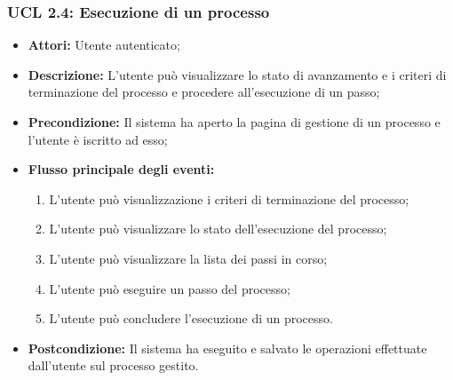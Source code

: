 \subsubsection{UCL 2.4: Esecuzione di un processo}
\begin{itemize}
\item \textbf{Attori:} Utente autenticato;
\item \textbf{Descrizione:} L'utente può visualizzare lo stato di avanzamento e i criteri di terminazione del processo e procedere all'esecuzione di un passo;
\item \textbf{Precondizione:} Il sistema ha aperto la pagina di gestione di un processo e l'utente è iscritto ad esso;
\item \textbf{Flusso principale degli eventi:}
\begin{enumerate}
\item L'utente può visualizzazione i criteri di terminazione del processo;
\item L'utente può visualizzare lo stato dell'esecuzione del processo;
\item L'utente può visualizzare la lista dei passi in corso;
\item L'utente può eseguire un passo del processo;
\item L'utente può concludere l'esecuzione di un processo.
\end{enumerate} 
\item \textbf{Postcondizione:} Il sistema ha eseguito e salvato le operazioni effettuate dall'utente sul processo gestito.
\end{itemize}

\hypertarget{L2.4.1}{}
